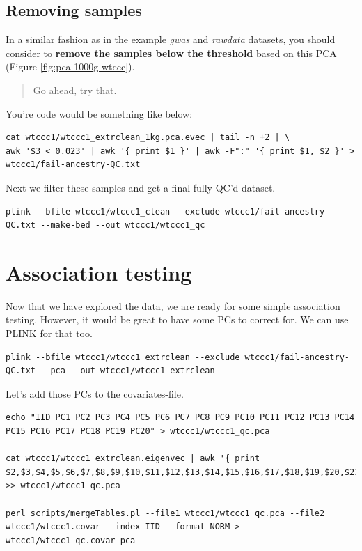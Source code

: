 \documentclass[
]{book}
\begin{document}
\hypertarget{removing-samples-1}{%
\subsection{Removing samples}\label{removing-samples-1}}

In a similar fashion as in the example \emph{gwas} and \emph{rawdata} datasets, you should consider to \textbf{remove the samples below the threshold} based on this PCA (Figure \ref{fig:pca-1000g-wtccc}).

\begin{quote}
Go ahead, try that.
\end{quote}

You're code would be something like below:

\begin{lstlisting}
cat wtccc1/wtccc1_extrclean_1kg.pca.evec | tail -n +2 | \
awk '$3 < 0.023' | awk '{ print $1 }' | awk -F":" '{ print $1, $2 }' > wtccc1/fail-ancestry-QC.txt
\end{lstlisting}

Next we filter these samples and get a final fully QC'd dataset.

\begin{lstlisting}
plink --bfile wtccc1/wtccc1_clean --exclude wtccc1/fail-ancestry-QC.txt --make-bed --out wtccc1/wtccc1_qc
\end{lstlisting}

\hypertarget{association-testing}{%
\section{Association testing}\label{association-testing}}

Now that we have explored the data, we are ready for some simple association testing. However, it would be great to have some PCs to correct for. We can use PLINK for that too.

\begin{lstlisting}
plink --bfile wtccc1/wtccc1_extrclean --exclude wtccc1/fail-ancestry-QC.txt --pca --out wtccc1/wtccc1_extrclean
\end{lstlisting}

Let's add those PCs to the covariates-file.

\begin{lstlisting}
echo "IID PC1 PC2 PC3 PC4 PC5 PC6 PC7 PC8 PC9 PC10 PC11 PC12 PC13 PC14 PC15 PC16 PC17 PC18 PC19 PC20" > wtccc1/wtccc1_qc.pca

cat wtccc1/wtccc1_extrclean.eigenvec | awk '{ print $2,$3,$4,$5,$6,$7,$8,$9,$10,$11,$12,$13,$14,$15,$16,$17,$18,$19,$20,$21,$22}' >> wtccc1/wtccc1_qc.pca

perl scripts/mergeTables.pl --file1 wtccc1/wtccc1_qc.pca --file2 wtccc1/wtccc1.covar --index IID --format NORM > wtccc1/wtccc1_qc.covar_pca
\end{lstlisting}
\end{document}
